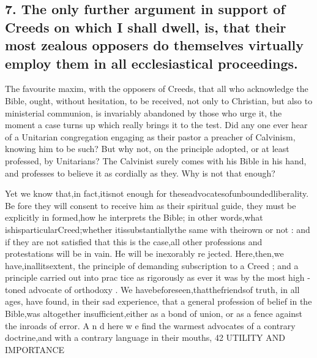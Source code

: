 \documentclass[
]{book}
\begin{document}
\hypertarget{the-only-further-argument-in-support-of-creeds-on-which-i-shall-dwell-is-that-their-most-zealous-opposers-do-themselves-virtually-employ-them-in-all-ecclesiastical-proceedings.}{%
\subsection{7. The only further argument in support of Creeds on which I shall dwell, is, that their most zealous opposers do themselves virtually employ them in all ecclesiastical proceedings.}\label{the-only-further-argument-in-support-of-creeds-on-which-i-shall-dwell-is-that-their-most-zealous-opposers-do-themselves-virtually-employ-them-in-all-ecclesiastical-proceedings.}}

The favourite maxim, with the opposers of Creeds, that all who acknowledge the Bible, ought, without hesitation, to be received, not only to Christian, but also to ministerial communion, is invariably abandoned by those who urge it, the moment a case turns up which really brings it to the test. Did any one ever hear of a Unitarian congregation engaging as their pastor a preacher of Calvinism, knowing him to be such? But why not, on the principle adopted, or at least professed, by Unitarians? The Calvinist surely comes with his Bible in his hand, and professes to believe it as cordially as they. Why is not that enough?

Yet we know that,in fact,itisnot enough for theseadvocatesofunboundedliberality. Be fore they will consent to receive him as their spiritual guide, they must be explicitly in formed,how he interprets the Bible; in other words,what ishisparticularCreed;whether itissubstantiallythe same with theirown or not : and if they are not satisfied that this is
the case,all other professions and protestations will be in vain. He will be inexorably re
jected. Here,then,we have,inallitsextent, the principle of demanding subscription to a Creed ; and a principle carried out into prac
tice as rigorously as ever it was by the most high -toned advocate of orthodoxy .
We havebeforeseen,thatthefriendsof truth, in all ages, have found, in their sad
experience, that a general profession of belief in the Bible,was altogether insufficient,either
as a bond of union, or as a fence against the inroads of error. A n d here w e find the
warmest advocates of a contrary doctrine,and with a contrary language in their mouths,
42 UTILITY AND IMPORTANCE
\end{document}
